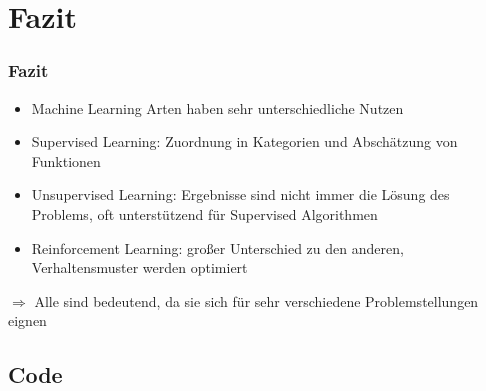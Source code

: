 \documentclass[11pt]{beamer}
\begin{document}
	\section{Fazit}
	
	\begin{frame}
		\frametitle{Fazit}
		\begin{itemize}
			\item Machine Learning Arten haben sehr unterschiedliche Nutzen
			\item Supervised Learning: Zuordnung in Kategorien und Abschätzung von Funktionen 
			\item Unsupervised Learning: Ergebnisse sind nicht immer die Lösung des Problems, oft unterstützend für Supervised Algorithmen
			\item Reinforcement Learning: großer Unterschied zu den anderen, Verhaltensmuster werden optimiert
		\end{itemize}
		$\Rightarrow$ Alle sind bedeutend, da sie sich für sehr verschiedene Problemstellungen eignen
		
	\end{frame}
	
	\subsection{Code}
	
\end{document}
